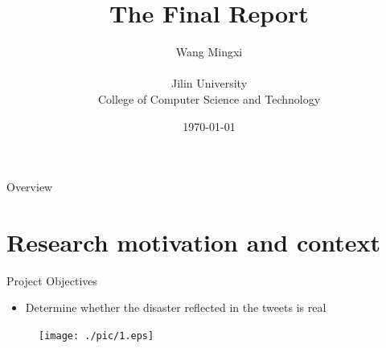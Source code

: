 \documentclass[
 size=14pt,
 paper=smartboard,  %
 mode=present, 		%
 display=slides, 	%
 style=tuliplab,  	%
 pauseslide,
 fleqn,leqno]{powerdot}
\title{The Final Report}
\author{
Wang Mingxi
\\
\\Jilin University
\\College of Computer Science and Technology
}
\date{\today} %
\begin{document}
\maketitle



\begin{slide}[toc=,bm=]{Overview}
\tableofcontents[content=currentsection,type=1]
\end{slide}


\section{Research motivation and context}

\begin{slide}{Project Objectives}

\begin{itemize}
\item Determine whether the disaster reflected in the tweets is real
\end{itemize}

\begin{center}
	\begin{figure}[htbp]
		\texttt{[image: ./pic/1.eps]}
	\end{figure}
\end{center}

\end{slide}
\end{document}
